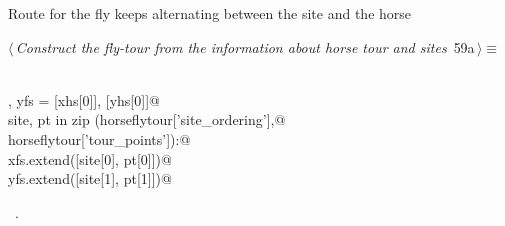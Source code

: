 \documentclass[11.5pt]{report}
\begin{document}
\vspace{-0.8cm} \newchunk Route for the fly  keeps alternating between the site and the horse
\begin{flushleft} \small
\begin{minipage}{\linewidth}\label{scrap87}\raggedright\small
{} $\langle\,${\itshape Construct the fly-tour from the information about horse tour and sites}\nobreak\ {\footnotesize {59a}}$\,\rangle\equiv$
\vspace{-1ex}
\begin{list}{}{} \item
\mbox{}\verb@@\\
\mbox{}\verb@xfs , yfs = [xhs[0]], [yhs[0]]@\\
\mbox{}\verb@for site, pt in zip (horseflytour['site_ordering'],@\\
\mbox{}\verb@                     horseflytour['tour_points']):@\\
\mbox{}\verb@   xfs.extend([site[0], pt[0]])@\\
\mbox{}\verb@   yfs.extend([site[1], pt[1]])@\\
\mbox{}\verb@@{\NWsep}
\end{list}
\vspace{-1.5ex}
\footnotesize
\begin{list}{}{\setlength{\itemsep}{-\parsep}\setlength{\itemindent}{-\leftmargin}}
\item \NWtxtMacroRefIn\ .

\item{}
\end{list}
\end{minipage}\vspace{4ex}
\end{flushleft}
\end{document}
